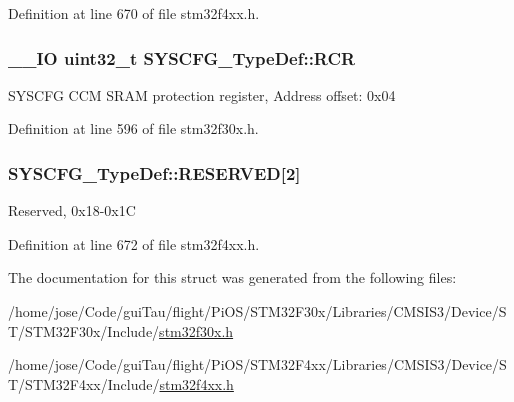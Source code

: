 Definition at line 670 of file stm32f4xx.\-h.

\hypertarget{struct_s_y_s_c_f_g___type_def_a6b19ffd6acd9c6a5103b93dd64281f63}{
\subsubsection[{R\-C\-R}]{\setlength{\rightskip}{0pt plus 5cm}\-\_\-\-\_\-\-I\-O {\bf uint32\-\_\-t} S\-Y\-S\-C\-F\-G\-\_\-\-Type\-Def\-::\-R\-C\-R}}\label{struct_s_y_s_c_f_g___type_def_a6b19ffd6acd9c6a5103b93dd64281f63}
S\-Y\-S\-C\-F\-G C\-C\-M S\-R\-A\-M protection register, Address offset\-: 0x04 

Definition at line 596 of file stm32f30x.\-h.

\hypertarget{struct_s_y_s_c_f_g___type_def_a43926e6d31a976a0018b2d1f5c92645d}{
\subsubsection[{R\-E\-S\-E\-R\-V\-E\-D}]{ S\-Y\-S\-C\-F\-G\-\_\-\-Type\-Def\-::\-R\-E\-S\-E\-R\-V\-E\-D\mbox{[}2\mbox{]}}}\label{struct_s_y_s_c_f_g___type_def_a43926e6d31a976a0018b2d1f5c92645d}
Reserved, 0x18-\/0x1\-C 

Definition at line 672 of file stm32f4xx.\-h.



The documentation for this struct was generated from the following files\-:\begin{DoxyCompactItemize}
\item 
/home/jose/\-Code/gui\-Tau/flight/\-Pi\-O\-S/\-S\-T\-M32\-F30x/\-Libraries/\-C\-M\-S\-I\-S3/\-Device/\-S\-T/\-S\-T\-M32\-F30x/\-Include/\hyperlink{stm32f30x_8h}{stm32f30x.\-h}\item 
/home/jose/\-Code/gui\-Tau/flight/\-Pi\-O\-S/\-S\-T\-M32\-F4xx/\-Libraries/\-C\-M\-S\-I\-S3/\-Device/\-S\-T/\-S\-T\-M32\-F4xx/\-Include/\hyperlink{stm32f4xx_8h}{stm32f4xx.\-h}\end{DoxyCompactItemize}
